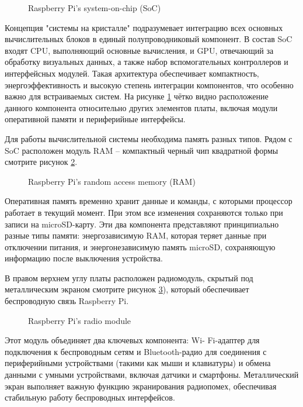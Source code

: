 \begin{figure}[H]
	\centering
	\caption{Raspberry Pi’s system-on-chip (SoC)}
	\label{fig:soc}
\end{figure}

Концепция "системы на кристалле" подразумевает интеграцию всех основных вычислительных блоков в единый полупроводниковый компонент. В состав SoC входят CPU, выполняющий основные вычисления, и GPU, отвечающий за обработку визуальных данных, а также набор вспомогательных контроллеров и интерфейсных модулей. Такая архитектура обеспечивает компактность, энергоэффективность и высокую степень интеграции компонентов, что особенно важно для встраиваемых систем. На рисунке \ref{fig:soc} чётко видно расположение данного компонента относительно других элементов платы, включая модули оперативной памяти и периферийные интерфейсы.

Для работы вычислительной системы необходима память разных типов. Рядом с SoC расположен модуль RAM -- компактный черный чип квадратной формы смотрите рисунок \ref{fig:ram}.

\begin{figure}[H]
	\centering
	\caption{Raspberry Pi’s random access memory (RAM)}
	\label{fig:ram}
\end{figure}

Оперативная память временно хранит данные и команды, с которыми процессор работает в текущий момент. При этом все изменения сохраняются только при записи на microSD-карту. Эти два компонента представляют принципиально разные типы памяти: энергозависимую RAM, которая теряет данные при отключении питания, и энергонезависимую память microSD, сохраняющую информацию после выключения устройства.


В правом верхнем углу платы расположен радиомодуль, скрытый под металлическим экраном смотрите рисунок \ref{fig:radio_module}), который обеспечивает беспроводную связь Raspberry Pi.

\begin{figure}[H]
	\centering
	\caption{Raspberry Pi’s radio module}
	\label{fig:radio_module}
\end{figure}

Этот модуль объединяет два ключевых компонента: Wi- Fi-адаптер для подключения к беспроводным сетям и Bluetooth-радио для соединения с периферийными устройствами (такими как мыши и клавиатуры) и обмена данными с умными устройствами, включая датчики и смартфоны. Металлический экран выполняет важную функцию экранирования радиопомех, обеспечивая стабильную работу беспроводных интерфейсов.


